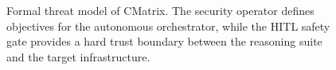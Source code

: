 \begin{figure}[htbp]
  \caption{Formal threat model of CMatrix. The security operator defines objectives for the autonomous orchestrator, while the HITL safety gate provides a hard trust boundary between the reasoning suite and the target infrastructure.}
  \label{fig:threat-model}
\end{figure}
